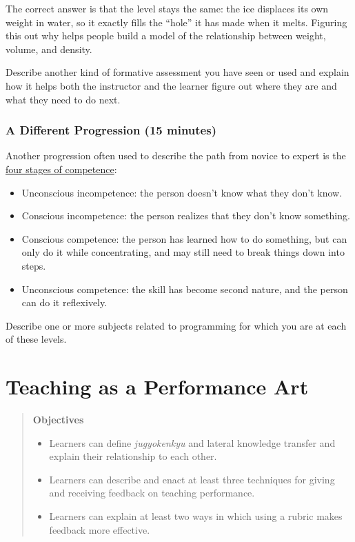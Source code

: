 \documentclass[10pt,statementpaper]{memoir}
\providecommand{\tightlist}{%
  \setlength{\itemsep}{0pt}\setlength{\parskip}{0pt}}
\begin{document}
The correct answer is that the level stays the same: the ice displaces
its own weight in water, so it exactly fills the ``hole'' it has made
when it melts. Figuring this out why helps people build a model of the
relationship between weight, volume, and density.

Describe another kind of formative assessment you have seen or used and
explain how it helps both the instructor and the learner figure out
where they are and what they need to do next.

\subsection*{A Different Progression (15
minutes)}\label{a-different-progression-15-minutes}

Another progression often used to describe the path from novice to
expert is the
\href{https://en.wikipedia.org/wiki/Four_stages_of_competence}{four
stages of competence}:

\begin{itemize}
\tightlist
\item
  Unconscious incompetence: the person doesn't know what they don't
  know.
\item
  Conscious incompetence: the person realizes that they don't know
  something.
\item
  Conscious competence: the person has learned how to do something, but
  can only do it while concentrating, and may still need to break things
  down into steps.
\item
  Unconscious competence: the skill has become second nature, and the
  person can do it reflexively.
\end{itemize}

Describe one or more subjects related to programming for which you are
at each of these levels.

\chapter{Teaching as a Performance
Art}\label{teaching-as-a-performance-art}

\begin{quote}
\textbf{Objectives}

\begin{itemize}
\tightlist
\item
  Learners can define \emph{jugyokenkyu} and lateral knowledge transfer
  and explain their relationship to each other.
\item
  Learners can describe and enact at least three techniques for giving
  and receiving feedback on teaching performance.
\item
  Learners can explain at least two ways in which using a rubric makes
  feedback more effective.
\end{itemize}
\end{quote}
\end{document}
